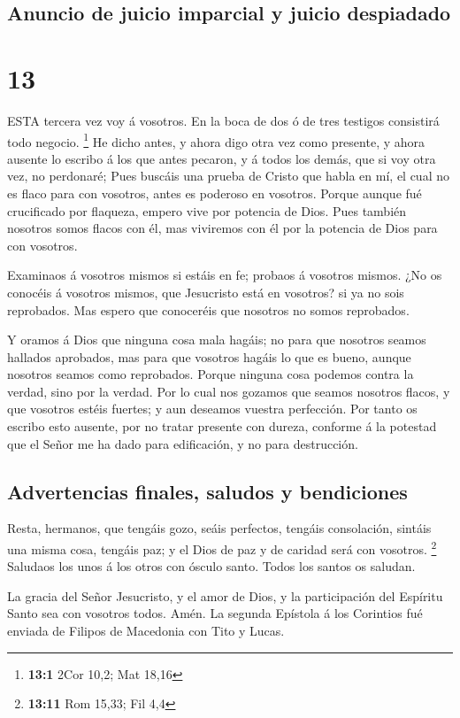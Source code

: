 \hypertarget{anuncio-de-juicio-imparcial-y-juicio-despiadado}{%
\subsection{Anuncio de juicio imparcial y juicio
despiadado}\label{anuncio-de-juicio-imparcial-y-juicio-despiadado}}

\hypertarget{section-12}{%
\section{13}\label{section-12}}

 ESTA tercera vez voy á vosotros. En la boca de dos ó de
tres testigos consistirá todo negocio. \footnote{\textbf{13:1} 2Cor
  10,2; Mat 18,16}  He dicho antes, y ahora digo otra vez
como presente, y ahora ausente lo escribo á los que antes pecaron, y á
todos los demás, que si voy otra vez, no perdonaré;  Pues
buscáis una prueba de Cristo que habla en mí, el cual no es flaco para
con vosotros, antes es poderoso en vosotros.  Porque aunque
fué crucificado por flaqueza, empero vive por potencia de Dios. Pues
también nosotros somos flacos con él, mas viviremos con él por la
potencia de Dios para con vosotros.

 Examinaos á vosotros mismos si estáis en fe; probaos á
vosotros mismos. ¿No os conocéis á vosotros mismos, que Jesucristo está
en vosotros? si ya no sois reprobados.  Mas espero que
conoceréis que nosotros no somos reprobados.

 Y oramos á Dios que ninguna cosa mala hagáis; no para que
nosotros seamos hallados aprobados, mas para que vosotros hagáis lo que
es bueno, aunque nosotros seamos como reprobados.  Porque
ninguna cosa podemos contra la verdad, sino por la verdad. 
Por lo cual nos gozamos que seamos nosotros flacos, y que vosotros
estéis fuertes; y aun deseamos vuestra perfección.  Por
tanto os escribo esto ausente, por no tratar presente con dureza,
conforme á la potestad que el Señor me ha dado para edificación, y no
para destrucción.

\hypertarget{advertencias-finales-saludos-y-bendiciones}{%
\subsection{Advertencias finales, saludos y
bendiciones}\label{advertencias-finales-saludos-y-bendiciones}}

 Resta, hermanos, que tengáis gozo, seáis perfectos,
tengáis consolación, sintáis una misma cosa, tengáis paz; y el Dios de
paz y de caridad será con vosotros. \footnote{\textbf{13:11} Rom 15,33;
  Fil 4,4}  Saludaos los unos á los otros con ósculo santo.
Todos los santos os saludan.

 La gracia del Señor Jesucristo, y el amor de Dios, y la
participación del Espíritu Santo sea con vosotros todos. Amén. La
segunda Epístola á los Corintios fué enviada de Filipos de Macedonia con
Tito y Lucas. 
